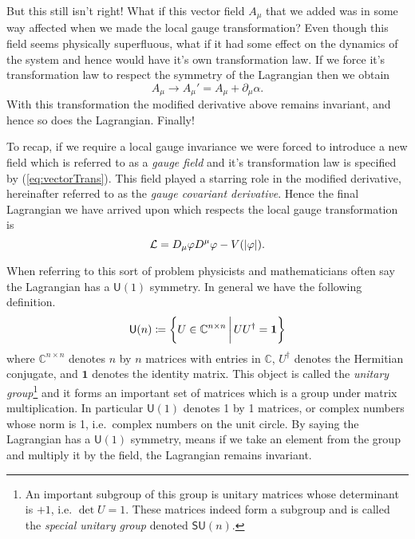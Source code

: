 But this still isn't right! What if this vector field \(A_\mu\) that we added
was in some way affected when we made the local gauge transformation? Even
though this field seems physically superfluous, what if it had some effect on
the dynamics of the system and hence would have it's own transformation law. If
we force it's transformation law to respect the symmetry of the Lagrangian then
we obtain
\begin{equation}\label{eq:vectorTrans}
    A_\mu\to A_\mu' = A_\mu + \partial_\mu\alpha.
\end{equation}
With this transformation the modified derivative above remains invariant, and
hence so does the Lagrangian. Finally!

To recap, if we require a local gauge invariance we were forced to introduce a
new field which is referred to as a \textit{gauge field} and it's transformation
law is specified by (\ref{eq:vectorTrans}). This field played a starring role in
the modified derivative, hereinafter referred to as the \textit{gauge covariant
    derivative}. Hence the final Lagrangian we have arrived upon which respects the
local gauge transformation is
\begin{equation}\label{eq:covLag}
    \mathcal{L} = D_\mu\varphi D^\mu\varphi - V(|\varphi|).
\end{equation}

When referring to this sort of problem physicists and mathematicians often say
the Lagrangian has a \(\mathsf{U}(1)\) symmetry. In general we have the
following definition.
\begin{equation}\label{eq:unitaryG}
    \mathsf{U}(n)\coloneqq\left\{U\in\mathbb{C}^{n\times n} \, \bigg{|} \, UU^\dagger = \mathbf{1}\right\}
\end{equation}
where \(\mathbb{C}^{n\times n}\) denotes \(n\) by \(n\) matrices with entries in
\(\mathbb{C}\), \(U^\dagger\) denotes the Hermitian conjugate, and \(\mathbf{1}\)
denotes the identity matrix. This object is called the
\textit{unitary group}\footnote{An important subgroup of this group is unitary
    matrices whose determinant is \(+1\), i.e. \(\det U = 1\). These matrices indeed
    form a subgroup and is called the \textit{special unitary group} denoted
    \(\mathsf{SU}(n)\).} and it forms an important set of matrices which is a group
under matrix multiplication. In particular \(\mathsf{U}(1)\) denotes 1 by 1
matrices, or complex numbers whose norm is 1, i.e.\ complex numbers on the unit
circle. By saying the Lagrangian has a \(\mathsf{U}(1)\) symmetry, means if we
take an element from the group and multiply it by the field, the Lagrangian
remains invariant.

